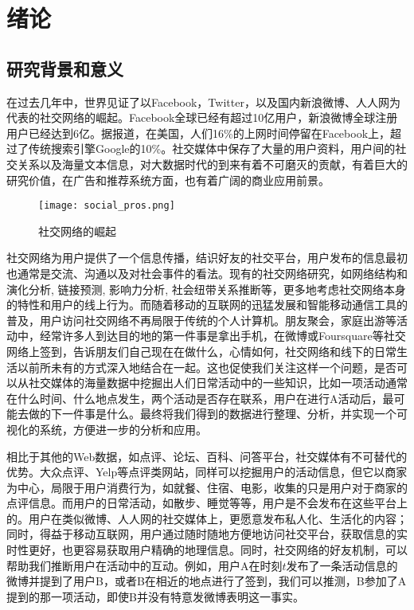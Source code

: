 \chapter{绪论}
\section{研究背景和意义}
在过去几年中，世界见证了以Facebook，Twitter，以及国内新浪微博、人人网为代表的社交网络的崛起。Facebook全球已经有超过10亿用户，新浪微博全球注册用户已经达到6亿。据报道，在美国，人们16\%的上网时间停留在Facebook上，超过了传统搜索引擎Google的10\%。社交媒体中保存了大量的用户资料，用户间的社交关系以及海量文本信息，对大数据时代的到来有着不可磨灭的贡献，有着巨大的研究价值，在广告和推荐系统方面，也有着广阔的商业应用前景。

\begin{figure}[!h]
\centering
\texttt{[image: social\_pros.png]}
\caption{社交网络的崛起}
\end{figure}

社交网络为用户提供了一个信息传播，结识好友的社交平台，用户发布的信息最初也通常是交流、沟通以及对社会事件的看法。现有的社交网络研究，如网络结构和演化分析\cite{leskovec2008microscopic}, 链接预测\cite{liben2007link}, 影响力分析\cite{tang2009social}, 社会纽带关系推断\cite{tang2011learning}等，更多地考虑社交网络本身的特性和用户的线上行为。而随着移动的互联网的迅猛发展和智能移动通信工具的普及，用户访问社交网络不再局限于传统的个人计算机。朋友聚会，家庭出游等活动中，经常许多人到达目的地的第一件事是拿出手机，在微博或Foursquare等社交网络上签到，告诉朋友们自己现在在做什么，心情如何，社交网络和线下的日常生活以前所未有的方式深入地结合在一起。这也促使我们关注这样一个问题，是否可以从社交媒体的海量数据中挖掘出人们日常活动中的一些知识，比如一项活动通常在什么时间、什么地点发生，两个活动是否存在联系，用户在进行A活动后，最可能去做的下一件事是什么。最终将我们得到的数据进行整理、分析，并实现一个可视化的系统，方便进一步的分析和应用。

相比于其他的Web数据，如点评、论坛、百科、问答平台，社交媒体有不可替代的优势。大众点评、Yelp等点评类网站，同样可以挖掘用户的活动信息，但它以商家为中心，局限于用户消费行为，如就餐、住宿、电影，收集的只是用户对于商家的点评信息。而用户的日常活动，如散步、睡觉等等，用户是不会发布在这些平台上的。用户在类似微博、人人网的社交媒体上，更愿意发布私人化、生活化的内容；同时，得益于移动互联网，用户通过随时随地方便地访问社交平台，获取信息的实时性更好，也更容易获取用户精确的地理信息。同时，社交网络的好友机制，可以帮助我们推断用户在活动中的互动。例如，用户A在时刻$t$发布了一条活动信息的微博并提到了用户B，或者B在相近的地点进行了签到，我们可以推测，B参加了A提到的那一项活动，即使B并没有特意发微博表明这一事实。

